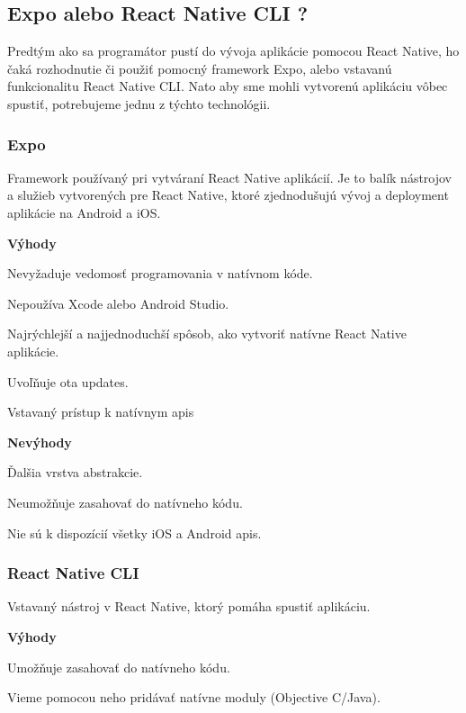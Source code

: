 \subsection{Expo alebo React Native CLI ?}
Predtým ako sa programátor pustí do vývoja aplikácie pomocou React Native, ho čaká rozhodnutie či použiť pomocný framework Expo, alebo vstavanú funkcionalitu React Native CLI. Nato aby sme mohli vytvorenú aplikáciu vôbec spustiť, potrebujeme jednu z týchto technológii. \\

\subsubsection{Expo}
Framework používaný pri vytváraní React Native aplikácií. Je to balík nástrojov a služieb vytvorených pre React Native, ktoré zjednodušujú vývoj a deployment aplikácie na Android a iOS. \cite{expo} \newline

{\bf Výhody}
\begin{itemize}
{\item Nevyžaduje vedomosť programovania v natívnom kóde.}
{\item Nepoužíva Xcode alebo Android Studio.} 
{\item Najrýchlejší a najjednoduchší spôsob, ako vytvoriť natívne React Native aplikácie.}
{\item Uvoľňuje \acrshort{ota} updates.} 
{\item Vstavaný prístup k natívnym \acrshort{api}s} \cite{expo}
\end{itemize}

{\bf Nevýhody}
\begin{itemize}
{\item Ďalšia vrstva abstrakcie.} 
{\item Neumožňuje zasahovať do natívneho kódu.}
{\item Nie sú k dispozícií všetky iOS a Android \acrshort{api}s.} \cite{expo}
\end{itemize}
\bigskip

\subsubsection{React Native CLI}
Vstavaný nástroj v React Native, ktorý pomáha spustiť aplikáciu. \newline

{\bf Výhody}
\begin{itemize}
{\item Umožňuje zasahovať do natívneho kódu.} 
{\item Vieme pomocou neho pridávať natívne moduly (Objective C/Java).} \cite{rncli} 
\end{itemize}

